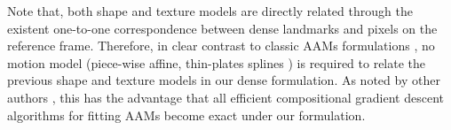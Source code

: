 Note that, both shape and texture models are directly related through the existent one-to-one correspondence between dense landmarks and pixels on the reference
frame. Therefore, in clear contrast to classic AAMs formulations \cite{Cootes2001, Matthews2004}, no motion model (piece-wise affine, thin-plates splines \cite{Bookstein1989}) is required to relate the previous shape and texture models in our dense formulation. As noted by other authors \cite{Amberg2009, Tzimiropoulos2014}, this has the advantage that all efficient compositional gradient descent algorithms for fitting AAMs \cite{Papandreou2008, Matthews2004, Amberg2009, Tzimiropoulos2013, Alabort2014} become exact under our formulation.

